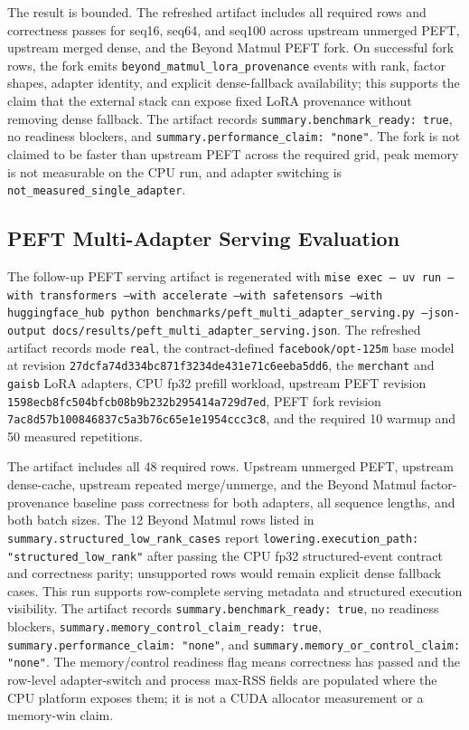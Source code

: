 \documentclass[11pt]{article}
\begin{document}
The result is bounded. The refreshed artifact includes all required rows and
correctness passes for seq16, seq64, and seq100 across upstream unmerged PEFT,
upstream merged dense, and the Beyond Matmul PEFT fork. On successful fork
rows, the fork emits
\texttt{beyond\_matmul\_lora\_provenance} events with rank, factor shapes,
adapter identity, and explicit dense-fallback availability; this supports the
claim that the external stack can expose fixed LoRA provenance without removing
dense fallback. The artifact records
\texttt{summary.benchmark\_ready: true}, no readiness blockers, and
\texttt{summary.performance\_claim: "none"}. The fork is not claimed to be
faster than upstream PEFT across the required grid, peak memory is not
measurable on the CPU run, and adapter switching is
\texttt{not\_measured\_single\_adapter}.

\subsection{PEFT Multi-Adapter Serving Evaluation}

The follow-up PEFT serving artifact is regenerated with \texttt{mise exec --
uv run --with transformers --with accelerate --with safetensors --with
huggingface\_hub python benchmarks/peft\_multi\_adapter\_serving.py
--json-output docs/results/peft\_multi\_adapter\_serving.json}. The refreshed
artifact records mode \texttt{real}, the contract-defined
\texttt{facebook/opt-125m} base model at revision
\texttt{27dcfa74d334bc871f3234de431e71c6eeba5dd6}, the
\texttt{merchant} and \texttt{gaisb} LoRA adapters, CPU fp32 prefill workload,
upstream PEFT revision \texttt{1598ecb8fc504bfcb08b9b232b295414a729d7ed},
PEFT fork revision \texttt{7ac8d57b100846837c5a3b76c65e1e1954ccc3c8}, and
the required 10 warmup and 50 measured repetitions.

The artifact includes all 48 required rows. Upstream unmerged PEFT, upstream
dense-cache, upstream repeated merge/unmerge, and the Beyond Matmul
factor-provenance baseline pass correctness for both adapters, all sequence
lengths, and both batch sizes. The 12 Beyond Matmul rows listed in
\texttt{summary.structured\_low\_rank\_cases} report
\texttt{lowering.execution\_path: "structured\_low\_rank"} after passing the
CPU fp32 structured-event contract and correctness parity; unsupported rows
would remain explicit dense fallback cases. This run supports row-complete
serving metadata and structured execution visibility. The artifact records
\texttt{summary.benchmark\_ready: true}, no readiness blockers,
\texttt{summary.memory\_control\_claim\_ready: true},
\texttt{summary.performance\_claim: "none"}, and
\texttt{summary.memory\_or\_control\_claim: "none"}.
The memory/control readiness flag means correctness has passed and the
row-level adapter-switch and process max-RSS fields are populated where the CPU
platform exposes them; it is not a CUDA allocator measurement or a memory-win
claim.
\end{document}
